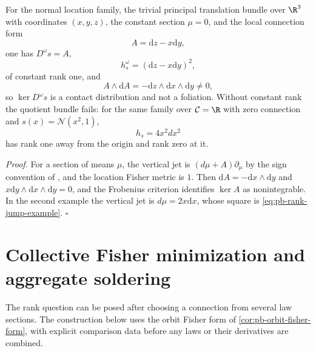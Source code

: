For the normal location family, the trivial principal translation bundle over \(\R^3\) with
coordinates \((x,y,z)\), the constant section \(\mu=0\), and the local connection form
\begin{equation}
A=\mathrm dz-x\mathrm dy,
\label{eq:pb-contact-connection}
\end{equation}
one has \(D^\omega s=A\),
\begin{equation}
h_s^\omega=(\mathrm dz-x\mathrm dy)^2,
\label{eq:pb-contact-pullback}
\end{equation}
of constant rank one, and
\begin{equation}
A\wedge\mathrm dA
=-\mathrm dz\wedge\mathrm dx\wedge\mathrm dy\ne0,
\label{eq:pb-contact-frobenius}
\end{equation}
so \(\ker D^\omega s\) is a contact distribution and not a foliation. Without constant rank the
quotient bundle fails: for the same family over \(\mathcal C=\R\) with zero connection and
\(s(x)=\mathcal N(x^2,1)\),
\begin{equation}
h_s=4x^2dx^2
\label{eq:pb-rank-jump-example}
\end{equation}
has rank one away from the origin and rank zero at it. 

\noindent\emph{Proof.}
For a section of means \(\mu\), the vertical jet is \((d\mu+A)\partial_\mu\) by the sign convention of
, and the location Fisher metric is \(1\). Then
\(\mathrm dA=-\mathrm dx\wedge\mathrm dy\) and \(x\mathrm dy\wedge\mathrm dx\wedge\mathrm dy=0\), and
the Frobenius criterion identifies \(\ker A\) as nonintegrable. In the second example the vertical jet
is \(d\mu=2x\mathrm dx\), whose square is \eqref{eq:pb-rank-jump-example}. \hfill$\square$

\section{Collective Fisher minimization and aggregate soldering}
\label{sec:pb-collective-soldering}

The rank question can be posed after choosing a connection from several law sections. The
construction below uses the orbit Fisher form of \cref{cor:pb-orbit-fisher-form}, with explicit
comparison data before any laws or their derivatives are combined.


